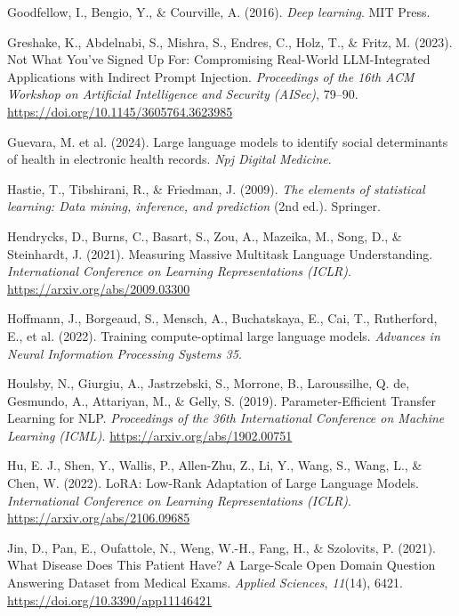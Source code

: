 \documentclass[
  letterpaper,
  11pt]{scrbook}
\newlength{\cslhangindent}
\newenvironment{CSLReferences}[2] %
 {\begin{list}{}{%
  \setlength{\itemindent}{0pt}
  \setlength{\leftmargin}{0pt}
  \setlength{\parsep}{0pt}
  \ifodd #1
   \setlength{\leftmargin}{\cslhangindent}
   \setlength{\itemindent}{-1\cslhangindent}
  \fi
  \setlength{\itemsep}{#2\baselineskip}}}
 {\end{list}}
\begin{document}
\begin{CSLReferences}{1}{0}
Goodfellow, I., Bengio, Y., \& Courville, A. (2016). \emph{Deep
learning}. MIT Press.

Greshake, K., Abdelnabi, S., Mishra, S., Endres, C., Holz, T., \& Fritz,
M. (2023). {Not What You've Signed Up For}: {Compromising Real-World
LLM-Integrated Applications with Indirect Prompt Injection}.
\emph{Proceedings of the 16th ACM Workshop on Artificial Intelligence
and Security (AISec)}, 79--90.
\url{https://doi.org/10.1145/3605764.3623985}

{Guevara, M. et al.} (2024). Large language models to identify social
determinants of health in electronic health records. \emph{Npj Digital
Medicine}.

Hastie, T., Tibshirani, R., \& Friedman, J. (2009). \emph{The elements
of statistical learning: Data mining, inference, and prediction} (2nd
ed.). Springer.

Hendrycks, D., Burns, C., Basart, S., Zou, A., Mazeika, M., Song, D., \&
Steinhardt, J. (2021). {Measuring Massive Multitask Language
Understanding}. \emph{International Conference on Learning
Representations (ICLR)}. \url{https://arxiv.org/abs/2009.03300}

{Hoffmann, J., Borgeaud, S., Mensch, A., Buchatskaya, E., Cai, T.,
Rutherford, E., et al.} (2022). Training compute-optimal large language
models. \emph{Advances in Neural Information Processing Systems 35}.

Houlsby, N., Giurgiu, A., Jastrzebski, S., Morrone, B., Laroussilhe, Q.
de, Gesmundo, A., Attariyan, M., \& Gelly, S. (2019).
{Parameter-Efficient Transfer Learning for NLP}. \emph{Proceedings of
the 36th International Conference on Machine Learning (ICML)}.
\url{https://arxiv.org/abs/1902.00751}

Hu, E. J., Shen, Y., Wallis, P., Allen-Zhu, Z., Li, Y., Wang, S., Wang,
L., \& Chen, W. (2022). {LoRA}: {Low-Rank Adaptation of Large Language
Models}. \emph{International Conference on Learning Representations
(ICLR)}. \url{https://arxiv.org/abs/2106.09685}

Jin, D., Pan, E., Oufattole, N., Weng, W.-H., Fang, H., \& Szolovits, P.
(2021). {What Disease Does This Patient Have? A Large-Scale Open Domain
Question Answering Dataset from Medical Exams}. \emph{Applied Sciences},
\emph{11}(14), 6421. \url{https://doi.org/10.3390/app11146421}


\end{CSLReferences}
\end{document}
